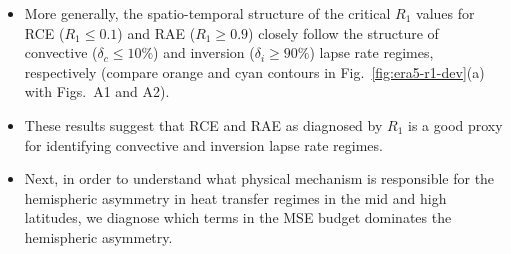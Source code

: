 \documentclass{ametsocV5}
\begin{document}
\begin{itemize}
  \item More generally, the spatio-temporal structure of the critical \(R_{1}\) values for RCE (\(R_{1}\le 0.1\)) and RAE (\(R_{1}\ge 0.9\)) closely follow the structure of convective (\(\delta_{c}\le 10\%\)) and inversion (\(\delta_{i}\ge 90\%\)) lapse rate regimes, respectively (compare orange and cyan contours in Fig.~\ref{fig:era5-r1-dev}(a) with Figs.~A1 and A2).
  \item These results suggest that RCE and RAE as diagnosed by \(R_{1}\) is a good proxy for identifying convective and inversion lapse rate regimes.
  \item Next, in order to understand what physical mechanism is responsible for the hemispheric asymmetry in heat transfer regimes in the mid and high latitudes, we diagnose which terms in the MSE budget dominates the hemispheric asymmetry.

\end{itemize}
\end{document}
